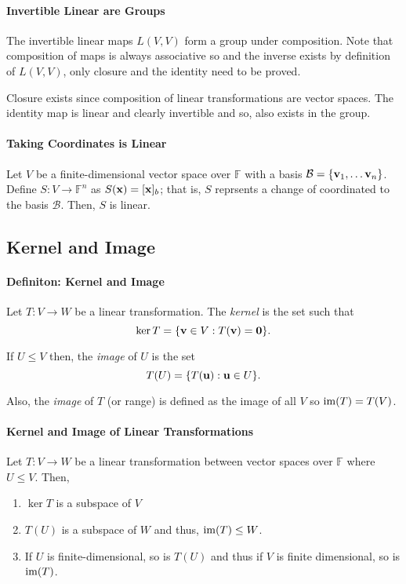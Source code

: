 \paragraph{Invertible Linear are Groups}
The invertible linear maps \(L(V, V)\) form a group under composition.
Note that composition of maps is always associative so and the
inverse exists by definition of \(L(V, V)\), only
closure and the identity need to be proved.

Closure exists since composition of linear transformations are vector spaces.
The identity map is linear and clearly invertible and so, also exists in
the group.

\paragraph{Taking Coordinates is Linear}
Let \(V\) be a finite-dimensional vector space over \(\mathbb{F}\) with a basis
\(\mathcal{B} = \{\mathbf{v}_1, \dots \mathbf{v}_n\}\).
Define \(S: V \to \mathbb{F}^n\) as \( S(\mathbf{x}) = [\mathbf{x}]_b \); that is, \(S\) reprsents
a change of coordinated to the basis \(\mathcal{B}\).
Then, \(S\) is linear.

%
%
%
\subsection{Kernel and Image}

\paragraph{Definiton: Kernel and Image}
Let \(T: V\to W\) be a linear transformation.
The \textit{kernel} is the set such that
\[
    \ker T = \{\mathbf{v} \in V : T(\mathbf{v}) = \mathbf{0}\}.
\]

If \(U \leq V\) then, the \textit{image} of \(U\) is the set \[
    T(U) = \{T(\mathbf{u}) : \mathbf{u} \in U \}.
\]

Also, the \textit{image} of \(T\) (or range) is defined as the image of all
\(V\) so \(\mathrm{im}(T) = T(V)\).

\paragraph{Kernel and Image of Linear Transformations}
Let \(T: V \to W\) be a linear transformation between vector spaces over
\(\mathbb{F}\) where \(U \leq V\).
Then,
\begin{enumerate}
    \item \(\ker T\) is a subspace of \(V\)
    \item \(T(U)\) is a subspace of \(W\) and thus, \(\mathrm{im}(T) \leq W\).
    \item If \(U\) is finite-dimensional, so is \(T(U)\) and thus if \(V\)
    is finite dimensional, so is \(\mathrm{im}(T)\).
\end{enumerate}

